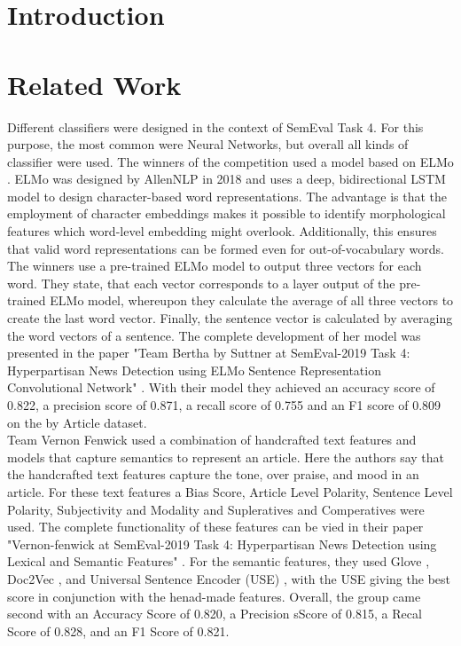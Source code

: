 \documentclass[a4paper, 11pt,titlepage,oneside,openany]{book}
\begin{document}

\chapter{Introduction}


\chapter{Related Work}
Different classifiers were designed in the context of SemEval Task 4. For this purpose, the most common were Neural Networks, but overall all kinds of classifier were used. The winners of the competition used a model based on ELMo \cite{elmo}. ELMo was designed by AllenNLP in 2018 and uses a deep, bidirectional LSTM model to design character-based word representations. The advantage is that the employment of character embeddings makes it possible to identify morphological features which word-level embedding might overlook. Additionally, this ensures that valid word representations can be formed even for out-of-vocabulary words. The winners use a pre-trained ELMo model to output three vectors for each word. They state, that each vector corresponds to a layer output of the pre-trained ELMo model, whereupon they calculate the average of all three vectors to create the last word vector. Finally, the sentence vector is calculated by averaging the word vectors of a sentence. The complete development of her model was presented in the paper "Team Bertha by Suttner at SemEval-2019 Task 4: Hyperpartisan News Detection using ELMo Sentence Representation Convolutional Network" \cite{gewinner}. With their model they achieved an accuracy score of 0.822, a precision score of 0.871, a recall score of 0.755 and an F1 score of 0.809 on the by Article dataset. \\
\noindent Team Vernon Fenwick used a combination of handcrafted text features and models that capture semantics to represent an article. Here the authors say that the handcrafted text features capture the tone, over praise, and mood in an article. For these text features a Bias Score, Article Level Polarity, Sentence Level Polarity, Subjectivity and Modality and Supleratives and Comperatives were used. The complete functionality of these features can be vied in their paper "Vernon-fenwick at SemEval-2019 Task 4: Hyperpartisan News Detection using Lexical and Semantic Features" \cite{vernon}. For the semantic features, they used Glove \cite{glove}, Doc2Vec \cite{doc2vec}, and Universal Sentence Encoder (USE) \cite{use}, with the USE giving the best score in conjunction with the henad-made features. Overall, the group came second with an Accuracy Score of 0.820, a Precision sScore of 0.815, a Recal Score of 0.828, and an F1 Score of 0.821.
\end{document}
